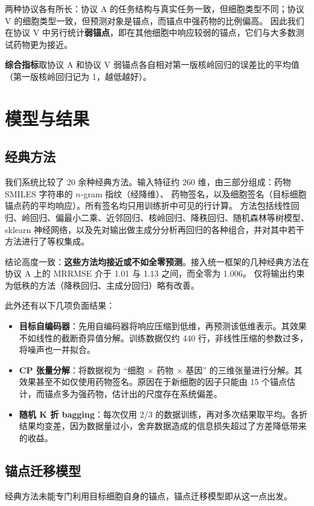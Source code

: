 \documentclass[11pt,a4paper]{article}
\begin{document}
两种协议各有所长：协议 A 的任务结构与真实任务一致，但细胞类型不同；协议 V 的细胞类型一致，但预测对象是锚点，而锚点中强药物的比例偏高。
因此我们在协议 V 中另行统计\textbf{弱锚点}，即在其他细胞中响应较弱的锚点，它们与大多数测试药物更为接近。

\textbf{综合指标}取协议 A 和协议 V 弱锚点各自相对第一版核岭回归的误差比的平均值（第一版核岭回归记为 1，越低越好）。

\section{模型与结果}

\subsection{经典方法}
我们系统比较了 20 余种经典方法。输入特征约 260 维，由三部分组成：药物 SMILES 字符串的 $n$-gram 指纹（经降维）、
药物签名，以及细胞签名（目标细胞锚点药的平均响应）。所有签名均只用训练折中可见的行计算。
方法包括线性回归、岭回归、偏最小二乘、近邻回归、核岭回归、降秩回归、随机森林等树模型、sklearn 神经网络，以及先对输出做主成分分析再回归的各种组合，并对其中若干方法进行了等权集成。

结论高度一致：\textbf{这些方法均接近或不如全零预测}。接入统一框架的几种经典方法在协议 A 上的 MRRMSE 介于 1.01 与 1.13 之间，而全零为 1.006。
仅将输出约束为低秩的方法（降秩回归、主成分回归）略有改善。

此外还有以下几项负面结果：
\begin{itemize}
\item \textbf{目标自编码器}：先用自编码器将响应压缩到低维，再预测该低维表示。其效果不如线性的截断奇异值分解。训练数据仅约 440 行，非线性压缩的参数过多，将噪声也一并拟合。
\item \textbf{CP 张量分解}：将数据视为 ``细胞 $\times$ 药物 $\times$ 基因'' 的三维张量进行分解。其效果甚至不如仅使用药物签名。原因在于新细胞的因子只能由 15 个锚点估计，而锚点多为强药物，估计出的尺度存在系统偏差。
\item \textbf{随机 K 折 bagging}：每次仅用 2/3 的数据训练，再对多次结果取平均。各折结果均变差，因为数据量过小，舍弃数据造成的信息损失超过了方差降低带来的收益。
\end{itemize}

\subsection{锚点迁移模型}
经典方法未能专门利用目标细胞自身的锚点，锚点迁移模型即从这一点出发。
\end{document}
